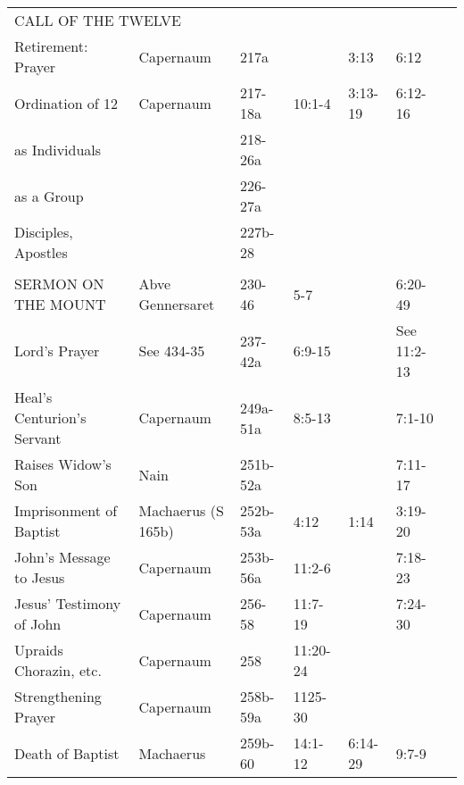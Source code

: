 \begin{longtable}[h]{lllllll}
\multicolumn{7}{l}{CALL OF THE TWELVE} \\
Retirement: Prayer                 & Capernaum           & 217a       &                 & 3:13            & 6:12                 & \\
Ordination of 12                   & Capernaum           & 217-18a    & 10:1-4          & 3:13-19         & 6:12-16              & \\
\quad 12 as Individuals            &                     & 218-26a    &                 &                 &                      & \\
\quad 12 as a Group                &                     & 226-27a    &                 &                 &                      & \\
\quad Disciples, Apostles          &                     & 227b-28    &                 &                 &                      & \\
\\
SERMON ON THE MOUNT                & Abve Gennersaret    & 230-46     & 5-7             &                 & 6:20-49              & \\
\quad Lord's Prayer                & See 434-35          & 237-42a    & 6:9-15          &                 & See 11:2-13          & \\
Heal's Centurion's Servant         & Capernaum           & 249a-51a   & 8:5-13          &                 & 7:1-10               & \\
Raises Widow's Son                 & Nain                & 251b-52a   &                 &                 & 7:11-17              & \\
Imprisonment of Baptist            & Machaerus (S 165b)  & 252b-53a   & 4:12            & 1:14            & 3:19-20              & \\
John's Message to Jesus            & Capernaum           & 253b-56a   & 11:2-6          &                 & 7:18-23              & \\
Jesus' Testimony of John           & Capernaum           & 256-58     & 11:7-19         &                 & 7:24-30              & \\
Upraids Chorazin, etc.             & Capernaum           & 258        & 11:20-24        &                 &                      & \\
Strengthening Prayer               & Capernaum           & 258b-59a   & 1125-30         &                 &                      & \\
Death of Baptist                   & Machaerus           & 259b-60    & 14:1-12         & 6:14-29         & 9:7-9                & \\

\end{longtable}
